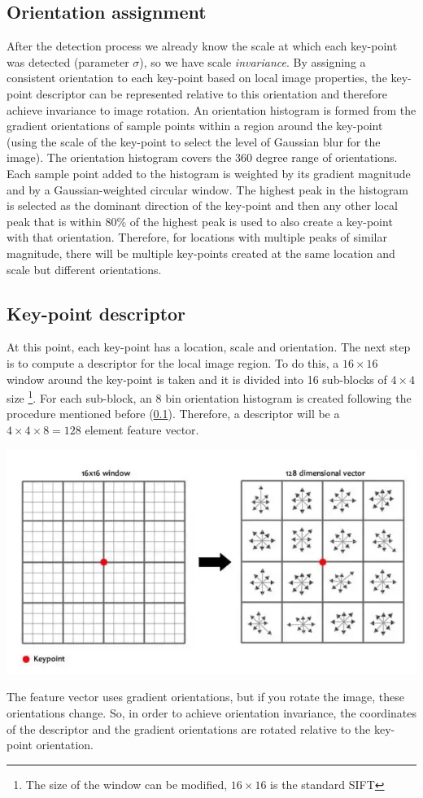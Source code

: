 \subsection{Orientation assignment}
\label{subsection:orientation}
After the detection process we already know the scale at which each key-point was detected (parameter $\sigma$), so we have scale \textit{invariance}. By assigning a consistent orientation to each key-point based on local image properties, the
key-point descriptor can be represented relative to this orientation and therefore achieve invariance to image rotation.\newline\newline
An orientation histogram is formed from the gradient orientations of sample points within a region around the key-point (using the scale of the key-point to select the level of Gaussian blur for the image). The orientation histogram covers the 360 degree range of orientations. Each sample point added to the histogram is weighted by its gradient magnitude and by a Gaussian-weighted circular window. The highest peak in the histogram is selected as the dominant direction of the key-point and then any other local peak that is within 80\% of the highest peak is used to also create a key-point with that orientation. Therefore, for locations with multiple peaks of similar magnitude, there will be multiple key-points created at the same location and scale but different orientations.
\subsection{Key-point descriptor}
At this point, each key-point has a location, scale and orientation. The next step is to compute a descriptor for the local image region. To do this, a $16 \times 16$ window around the key-point is taken and it is divided into 16 sub-blocks of $4 \times 4$ size \footnote{The size of the window can be modified, $16 \times 16$ is the standard SIFT }. For each sub-block, an 8 bin orientation histogram is created following the procedure mentioned before (\ref{subsection:orientation}). Therefore, a descriptor will be a $4 \times 4 \times 8 = 128$ element feature vector.
\begin{center}
    \includegraphics[scale = 0.7]{images/sift descriptor.png}
\end{center}
The feature vector uses gradient orientations, but if you rotate the image, these orientations change. So, in order to achieve orientation
invariance, the coordinates of the descriptor and the gradient orientations are rotated relative to the key-point orientation.
